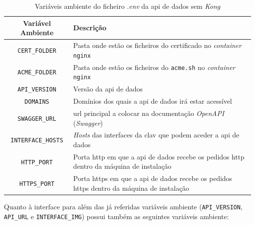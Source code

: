 \begin{table}[H]
\fontsize{10}{12}\selectfont
\begin{tabularx}{\textwidth}{|c|X|}
    \hline
    Variável Ambiente & Descrição \\ \hline
    \texttt{CERT\_FOLDER} & Pasta onde estão os ficheiros do certificado no \textit{container} \texttt{nginx} \\ \hline
    \texttt{ACME\_FOLDER} & Pasta onde estão os ficheiros do \texttt{acme.sh} no \textit{container} \texttt{nginx} \\ \hline
    \texttt{API\_VERSION} & Versão da \acrshort{api} de dados \\ \hline
    \texttt{DOMAINS} & Domínios dos quais a \acrshort{api} de dados irá estar acessível \\ \hline
    \texttt{SWAGGER\_URL} & \acrshort{url} principal a colocar na documentação \textit{OpenAPI} (\textit{Swagger}) \\ \hline
    \texttt{INTERFACE\_HOSTS} & \textit{Hosts} das interfaces da \acrshort{clav} que podem aceder a \acrshort{api} de dados \\ \hline
    \texttt{HTTP\_PORT} & Porta \acrshort{http} em que a \acrshort{api} de dados recebe os pedidos \acrshort{http} dentro da máquina de instalação \\ \hline
    \texttt{HTTPS\_PORT} & Porta \acrshort{https} em que a \acrshort{api} de dados recebe os pedidos \acrshort{https} dentro da máquina de instalação \\ \hline
\end{tabularx}
\caption{Variáveis ambiente do ficheiro \textit{.env} da \acrshort{api} de dados sem \textit{Kong}}
\end{table}

Quanto à interface para além das já referidas variáveis ambiente (\texttt{API\_VERSION}, \texttt{API\_URL} e \texttt{INTERFACE\_IMG}) possui também as seguintes variáveis ambiente:

